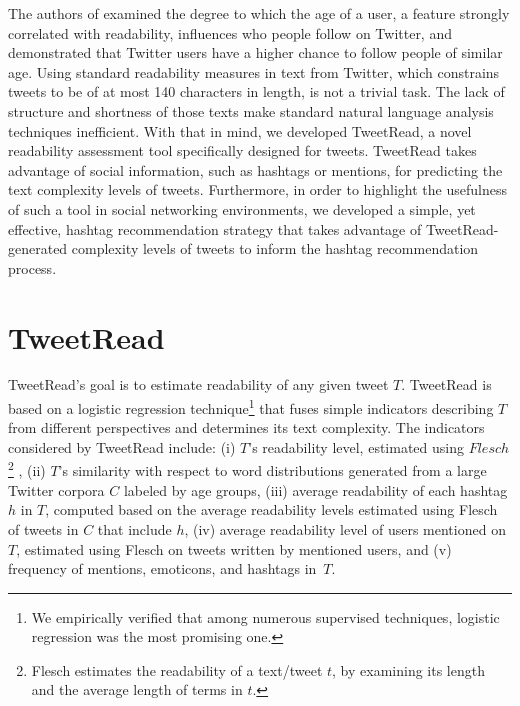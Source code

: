 \documentclass{sig-alternate-05-2015}
\begin{document}
The authors of \cite{age} examined the degree to which the age of a user, a feature strongly correlated with readability, influences who people follow on Twitter, and demonstrated that Twitter users have a higher chance to follow people of similar age.
Using standard readability measures in text from Twitter, which constrains tweets to be of at most 140 characters in length, is not a trivial task. The lack of structure and shortness of those texts make standard natural language analysis techniques inefficient. With that in mind, we developed TweetRead, a novel readability assessment tool specifically designed for tweets. TweetRead takes advantage of social information, such as hashtags or mentions, for predicting the text complexity levels of tweets. Furthermore, in order to highlight the usefulness of such a tool in social networking environments, we developed a simple, yet effective, hashtag recommendation strategy that takes advantage of TweetRead-generated complexity levels of tweets to inform the hashtag recommendation process. 


\section{TweetRead}
TweetRead's goal is to estimate readability of any given tweet $T$. TweetRead is based on a logistic regression technique\footnote{We empirically verified that among numerous supervised techniques, logistic regression was the most promising one.} that fuses simple indicators describing $T$ from different perspectives and determines its text complexity. The indicators considered by TweetRead include: (i) $T$'s readability level, estimated using $Flesch$\footnote{Flesch estimates the readability of a text/tweet $t$, by examining its length and the average length of terms in $t$.} \cite{Fle48}, (ii) $T$'s similarity with respect to word distributions generated from a large Twitter corpora $C$ labeled by age groups, (iii) average readability of each hashtag $h$ in $T$, computed based on the average readability levels estimated using Flesch of tweets in $C$ that include $h$, (iv) average readability level of users mentioned on $T$, estimated using Flesch on tweets written by mentioned users, and (v) frequency of mentions, emoticons, and hashtags in~$T$. 
\end{document}
